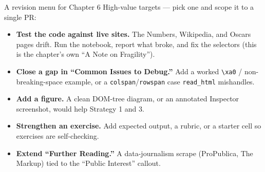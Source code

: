 \documentclass[9pt,aspectratio=169]{beamer}
\begin{document}
\begin{frame}{A revision menu for Chapter 6}
    High-value targets --- pick one and scope it to a single PR:
    \begin{itemize}
        \item \textbf{Test the code against live sites.} The Numbers, Wikipedia, and Oscars pages drift. Run the notebook, report what broke, and fix the selectors (this is the chapter's own ``A Note on Fragility'').
        \item \textbf{Close a gap in ``Common Issues to Debug.''} Add a worked \texttt{\textbackslash xa0} / non-breaking-space example, or a \texttt{colspan}/\texttt{rowspan} case \texttt{read\_html} mishandles.
        \item \textbf{Add a figure.} A clean DOM-tree diagram, or an annotated Inspector screenshot, would help Strategy 1 and 3.
        \item \textbf{Strengthen an exercise.} Add expected output, a rubric, or a starter cell so exercises are self-checking.
        \item \textbf{Extend ``Further Reading.''} A data-journalism scrape (ProPublica, The Markup) tied to the ``Public Interest'' callout.
    \end{itemize}
\end{frame}
\end{document}

